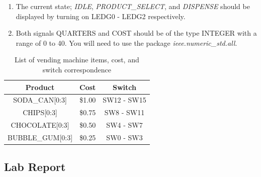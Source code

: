 \begin{enumerate}
	\item The current state; \emph{IDLE}, \emph{PRODUCT\_SELECT}, and \emph{DISPENSE} should be displayed by turning on LEDG0 - LEDG2 respectively.

	\item Both signals QUARTERS and COST should be of the type INTEGER with a range of 0 to 40.  You will need to use the package \emph{ieee.numeric\_std.all}.
	
\end{enumerate}

\begin{table}[H]
	\centering
	\caption{List of vending machine items, cost, and switch correspondence}
	\begin{tabular}{ | c | c | c | }
		\hline                        
 		\bf Product & \bf Cost & \bf Switch\\ \hline
 		SODA\_CAN[0:3] & \$1.00 & SW12 - SW15 \\ \hline
		CHIPS[0:3] & \$0.75 & SW8 - SW11 \\ \hline
		CHOCOLATE[0:3] & \$0.50 & SW4 - SW7 \\ \hline
		BUBBLE\_GUM[0:3] & \$0.25 & SW0 - SW3 \\
 		\hline
	\end{tabular}
	\label{tab:costlist}
\end{table}


\subsection{Lab Report}

